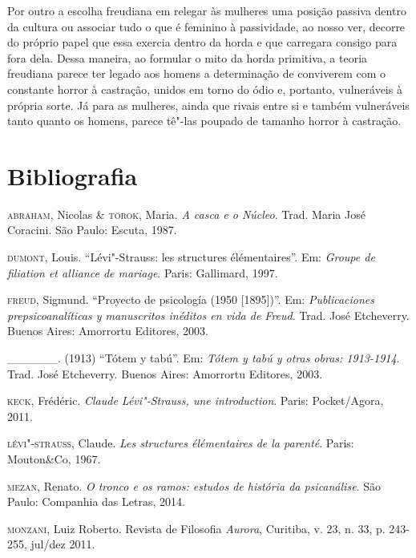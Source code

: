 Por outro a escolha freudiana em relegar às mulheres uma posição passiva
dentro da cultura ou associar tudo o que é feminino à passividade, ao
nosso ver, decorre do próprio papel que essa exercia dentro da horda e
que carregara consigo para fora dela. Dessa maneira, ao formular o mito
da horda primitiva, a teoria freudiana parece ter legado aos homens a
determinação de conviverem com o constante horror à castração, unidos em
torno do ódio e, portanto, vulneráveis à própria sorte. Já para as
mulheres, ainda que rivais entre si e também vulneráveis tanto quanto os
homens, parece tê"-las poupado de tamanho horror à castração.

\pagebreak

\section{Bibliografia}

\begin{Parskip}
\textsc{abraham}, Nicolas \& \textsc{törok}, Maria. \emph{A casca e o Núcleo}. Trad. Maria José
Coracini. São Paulo: Escuta, 1987.

\textsc{dumont}, Louis. ``Lévi"-Strauss: les structures élémentaires''. Em: \emph{Groupe de
filiation et alliance de mariage}. Paris: Gallimard, 1997.

\textsc{freud}, Sigmund. ``Proyecto de psicología (1950 {[}1895{]})''. Em: \emph{Publicaciones
prepsicoanalíticas y manuscritos inéditos en vida de Freud}. Trad. José
Etcheverry. Buenos Aires: Amorrortu Editores, 2003.

\_\_\_\_\_\_. (1913) ``Tótem y tabú''. Em: \emph{Tótem y tabú y otras obras:
1913-1914}. Trad. José Etcheverry. Buenos Aires: Amorrortu Editores, 2003.

\textsc{keck}, Frédéric. \emph{Claude Lévi"-Strauss, une introduction}. Paris: Pocket/Agora, 2011.

\textsc{lévi"-strauss}, Claude. \emph{Les structures élémentaires de la parenté}. Paris:
Mouton\&Co, 1967.

\textsc{mezan}, Renato. \emph{O tronco e os ramos: estudos de história da psicanálise}. São
Paulo: Companhia das Letras, 2014.

\textsc{monzani}, Luiz Roberto. Revista de Filosofia \emph{Aurora}, Curitiba, v. 23, n. 33, p.
243-255, jul/dez 2011.
\end{Parskip}